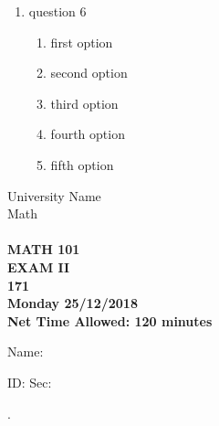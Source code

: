 \documentclass[amsfonts,bezier,leqno,fleqn,12pt,a4paper]{article}
\begin{document}
{{\begin{large}
\begin{enumerate}
\begin{enumerate}
  \item first option
  \item second option
  \item third option
  \item fourth option
  \item fifth option
\end{enumerate}
\vspace {3.5cm}
\item question 6
\vspace {0.3in}
\setcounter{equation}{0}

\begin{enumerate}
  \item first option
  \item second option
  \item third option
  \item fourth option
  \item fifth option
\end{enumerate}
\newpage
\end{enumerate}
\end{large}

\newpage


\thispagestyle{empty}
\begin{center}
    \begin{large}
        University Name \\ 
        Math \\ 
        \vspace*{4.5cm}
        {\bf {} }  \hfill {\bf {}} \\
        {\bf MATH 101 }  \\
        {\bf EXAM II }  \\
        {\bf 171 }  \\
        {\bf Monday 25/12/2018 }  \\ 
        {\bf Net Time Allowed: 120 minutes }  \\
        \vspace*{0.2cm}

    \end{large}
\end{center}

\large{Name:  }\hrulefill

\vspace{3mm}

\large{ID: } \hrulefill \large{  Sec: } \hrulefill \large{.

\vspace{1cm}

}}}
\end{document}
